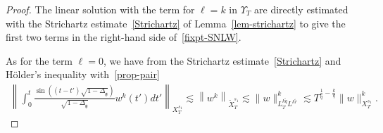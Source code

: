 \documentclass[AHL,Unicode,longabstracts,published]{cedram}
\newcommand{\g}{\mathfrak{g}}
\newcommand{\Dlg}{\Delta_{\g}}
\newcommand{\les}{\lesssim}
\begin{document}
\begin{proof}
The linear solution with the term for $\ell=k$ in $\Upsilon_T$ are directly estimated with the Strichartz estimate~\eqref{Strichartz} of Lemma~\ref{lem-strichartz} to give the first two terms in the right-hand side of~\eqref{fixpt-SNLW}.

As for the term $\ell=0$, we have from the Strichartz estimate~\eqref{Strichartz} and H\"older's inequality with~\eqref{prop-pair}
\begin{align*}
\left\|\int_0^t\frac{\sin\left((t-t')\sqrt{1-\Dlg}\right)}{\sqrt{1-\Dlg}}w^{k}(t')dt'\right\|_{X^{s_1}_T}\les \left\|w^k\right\|_{\widetilde{X}^{s_1}_T} \les \|w\|_{L^{k\widetilde{q}}_TL^{k\widetilde{r}}}^k \les T^{\frac1{\widetilde{q}}-\frac{k}{q}}\|w\|_{X^{s_1}_T}^k.
\end{align*}


\end{proof}
\end{document}
